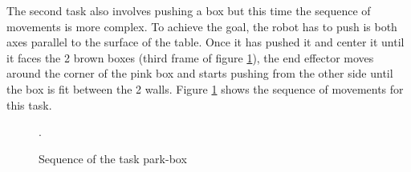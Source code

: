 The second task also involves pushing a box but this time the sequence of movements is more complex. To achieve the goal, the robot has to push is both axes parallel to the surface of the table. Once it has pushed it and center it until it faces the 2 brown boxes (third frame of figure \ref{fig:sequence-park-box}), the end effector moves around the corner of the pink box and starts pushing from the other side until the box is fit between the 2 walls. Figure \ref{fig:sequence-park-box} shows the sequence of movements for this task.


 \begin{figure}[H]
  \centering
   \hfill
   \hfill
   \hfill
   \hfill
   \hfill
  \caption{Sequence of the task park-box}.
  \label{fig:sequence-park-box}
\end{figure}


